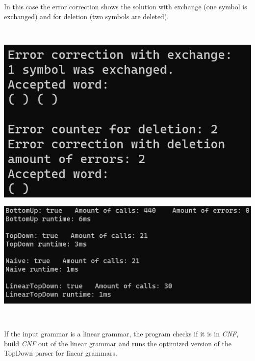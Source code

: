 \documentclass[a4paper, 11pt]{article}
\begin{document}
\begin{minipage}{0.35\textwidth}
In this case the error correction shows the solution with exchange (one symbol is exchanged) and for deletion (two symbols are deleted).

\end{minipage}\begin{minipage}{0.1\textwidth}
\ 
\end{minipage}\begin{minipage}{0.55\textwidth}
\includegraphics[scale=0.7]{images/terminal_4.png}
\end{minipage}

\begin{minipage}{0.5\textwidth}
\includegraphics[scale=0.55]{images/terminal_5.png}
\end{minipage}\begin{minipage}{0.1\textwidth}
\ 
\end{minipage}\begin{minipage}{0.4\textwidth}
If the input grammar is a linear grammar, the program checks if it is in \textit{CNF}, build \textit{CNF} out of the linear grammar and runs the optimized version of the TopDown parser for linear grammars.
\end{minipage}
\end{document}
